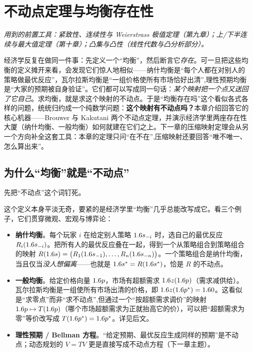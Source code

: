 \chapter{不动点定理与均衡存在性}
\label{ch:fixedpt}

\noindent\emph{用到的前置工具：紧致性、连续性与 Weierstrass 极值定理（第九章）；上/下半连续与最大值定理（第十章）；凸集与凸性（线性代数与凸分析部分）。}
\medskip

经济学反复在做同一件事：先定义一个``均衡''，然后断言它\emph{存在}。可一旦把这些均衡的定义摊开来看，会发现它们惊人地相似——纳什均衡是``每个人都在对别人的策略做最优反应''，瓦尔拉斯均衡是``一组价格使所有市场恰好出清'',理性预期均衡是``大家的预期被自身验证''。它们都可以写成同一句话：\emph{某个映射把一个点又送回了它自己}。求均衡，就是求这个映射的不动点。于是``均衡存在吗''这个看似各式各样的问题，统统归约成一个纯数学问题：\textbf{这个映射有不动点吗？}本章介绍回答它的核心机器——Brouwer 与 Kakutani 两个不动点定理，并演示经济学里两座存在性大厦（纳什均衡、一般均衡）如何就建在它们之上。下一章的压缩映射定理会从另一个方向补全这套工具：本章的定理只问``在不在'',压缩映射还要回答``唯不唯一、怎么算出来''。

\section{为什么``均衡''就是``不动点''}
\label{sec:fixedpt-motivation}

先把``不动点''这个词钉死。


这个定义本身平淡无奇，要紧的是经济学里``均衡''几乎总能改写成它。看三个例子，它们贯穿微观、宏观与博弈论：

\begin{itemize}
    \item \textbf{纳什均衡}。每个玩家 $i$ 在给定别人策略 $1.6 s_{-i}$ 时，选自己的最优反应 $R_i(1.6 s_{-i})$。把所有人的最优反应叠在一起，得到一个从策略组合到策略组合的映射 $R(1.6 s)=\bigl(R_1(1.6 s_{-1}),\dots,R_n(1.6 s_{-n})\bigr)$。一个策略组合是纳什均衡，当且仅当\emph{没人想偏离}——也就是 $1.6 s^*=R(1.6 s^*)$，恰是 $R$ 的不动点。
    \item \textbf{一般均衡}。给定价格向量 $1.6 p$，市场有超额需求 $1.6 z(1.6 p)$（需求减供给）。瓦尔拉斯均衡是一组使所有市场出清的价格，即 $1.6 z(1.6 p^*)=1.6 0$。这看似是``求零点''而非``求不动点'',但通过一个``按超额需求调价''的映射 $1.6 p\mapsto T(1.6 p)$（哪个市场超额需求为正就抬高它的价），可以把``超额需求为零''等价改写成 $T(1.6 p^*)=1.6 p^*$。详见后文。
    \item \textbf{理性预期 / Bellman 方程}。``给定预期、最优反应生成同样的预期''是不动点；动态规划的 $V=TV$ 更是直接写成不动点方程（下一章主题）。
\end{itemize}

